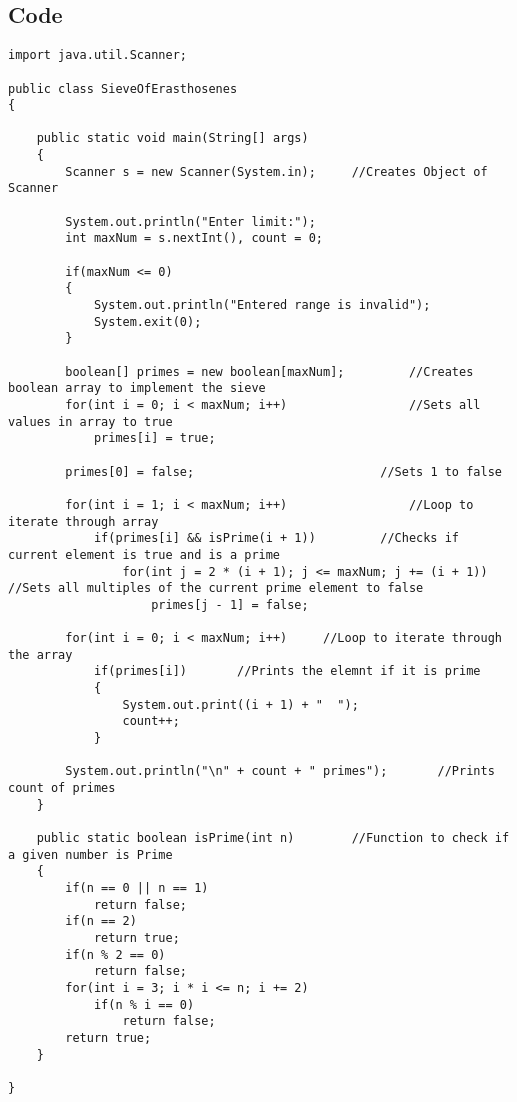 \documentclass[ProgramminAssignment.tex]{subfiles}
\begin{document}
\subsection{Code}
\begin{lstlisting}
import java.util.Scanner;

public class SieveOfErasthosenes
{

	public static void main(String[] args)
	{
		Scanner s = new Scanner(System.in);		//Creates Object of Scanner
		
		System.out.println("Enter limit:");
		int maxNum = s.nextInt(), count = 0;
		
		if(maxNum <= 0)
		{
			System.out.println("Entered range is invalid");
			System.exit(0);
		}
		
		boolean[] primes = new boolean[maxNum];			//Creates boolean array to implement the sieve
		for(int i = 0; i < maxNum; i++)					//Sets all values in array to true
			primes[i] = true;
		
		primes[0] = false;							//Sets 1 to false
		
		for(int i = 1; i < maxNum; i++)					//Loop to iterate through array
			if(primes[i] && isPrime(i + 1))			//Checks if current element is true and is a prime
				for(int j = 2 * (i + 1); j <= maxNum; j += (i + 1))	//Sets all multiples of the current prime element to false
					primes[j - 1] = false;
		
		for(int i = 0; i < maxNum; i++)		//Loop to iterate through the array
			if(primes[i])		//Prints the elemnt if it is prime
			{
				System.out.print((i + 1) + "  ");
				count++;
			}
			
		System.out.println("\n" + count + " primes");		//Prints count of primes
	}
	
	public static boolean isPrime(int n)		//Function to check if a given number is Prime
	{
		if(n == 0 || n == 1)
			return false;
		if(n == 2)
			return true;
		if(n % 2 == 0)
			return false;
		for(int i = 3; i * i <= n; i += 2)
			if(n % i == 0)
				return false;
		return true;
	}

}

\end{lstlisting}
\end{document}
